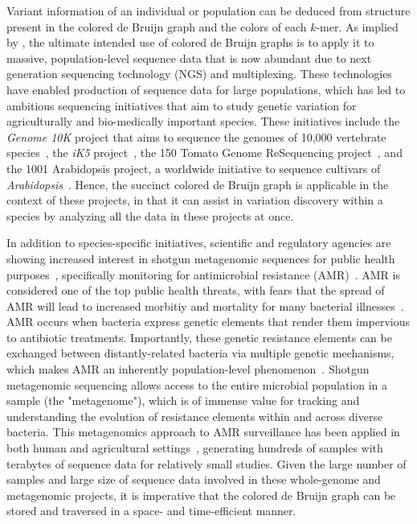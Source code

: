 \documentclass[doctor]{thesis}
\begin{document}
Variant information of an individual or population can be deduced from structure present in the colored de Bruijn graph and the colors of each $k$-mer.
As implied by \cite{ICTFM12}, the ultimate intended use of colored de Bruijn graphs is to apply it to massive, population-level sequence data that is now abundant due to next generation sequencing technology (NGS) and multiplexing. These technologies have enabled production of sequence data for large populations, which has led to ambitious sequencing initiatives that aim to study genetic variation for agriculturally and bio-medically important species.  These initiatives include the {\em Genome 10K} project that aims to sequence the genomes of 10,000 vertebrate species~\citep{Haussler:2009}, the {\em iK5} project~\citep{Robinson:2011}, the 150 Tomato Genome ReSequencing project~\citep{tomato1,tomato2}, and the 1001 Arabidopsis project, a worldwide initiative to sequence cultivars of {\em Arabidopsis}~\citep{arabidopsis}.  Hence, the succinct colored de Bruijn graph is applicable in the context of these projects, in that it can assist in variation discovery within a species by analyzing all the data in these projects at once. 

In addition to species-specific initiatives, scientific and regulatory agencies are showing increased interest in shotgun metagenomic sequences for public health purposes~\citep{EMBL-EBI-Metagenomics,Miller2013}, specifically monitoring for antimicrobial resistance (AMR)~\cite{baquero_metagenomic_epi, port_2014_metagenomics_AMR_monitoring}.  AMR is considered one of the top public health threats, with fears that the spread of AMR will lead to increased morbitiy and mortality for many bacterial illnesses~\citep{CARB,FAOActionPlan2016}.  AMR occurs when bacteria express genetic elements that render them impervious to antibiotic treatments.  Importantly, these genetic resistance elements can be exchanged between distantly-related bacteria via multiple genetic mechanisms, which makes AMR an inherently population-level phenomenon~\citep{Baquero2013}.   Shotgun metagenomic sequencing allows access to the entire microbial population in a sample (the "metagenome"), which is of immense value for tracking and understanding the evolution of resistance elements within and across diverse bacteria\citep{MacLean2010}.  This metagenomics approach to AMR surveillance has been applied in both human and agricultural settings~\citep{noyes2016resistome,King2016}, generating hundreds of samples with terabytes of sequence data for relatively small studies.  Given the large number of samples and large size of sequence data involved in these whole-genome and metagenomic projects, it is imperative that the colored de Bruijn graph can be stored and traversed in a space- and time-efficient manner.
 
\end{document}
